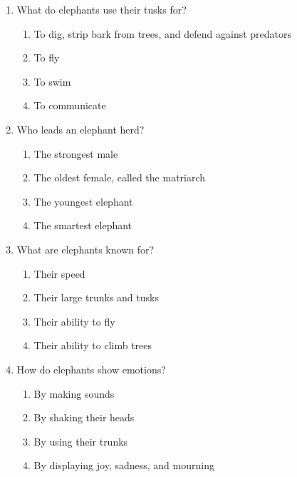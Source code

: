 \documentclass[12pt]{article}
\begin{document}
\begin{enumerate}
    \vspace{0.5cm}

    \item What do elephants use their tusks for?

    \begin{enumerate}[label=\Alph*.]
        \item To dig, strip bark from trees, and defend against predators
        \item To fly
        \item To swim
        \item To communicate
    \end{enumerate}
    
    \vspace{0.5cm}

    \item Who leads an elephant herd?

    \begin{enumerate}[label=\Alph*.]
        \item The strongest male
        \item The oldest female, called the matriarch
        \item The youngest elephant
        \item The smartest elephant
    \end{enumerate}
    
    \vspace{0.5cm}

    \item What are elephants known for?

    \begin{enumerate}[label=\Alph*.]
        \item Their speed
        \item Their large trunks and tusks
        \item Their ability to fly
        \item Their ability to climb trees
    \end{enumerate}
    
    \vspace{0.5cm}

    \item How do elephants show emotions?

    \begin{enumerate}[label=\Alph*.]
        \item By making sounds
        \item By shaking their heads
        \item By using their trunks
        \item By displaying joy, sadness, and mourning
    \end{enumerate}
    

\end{enumerate}
\end{document}
